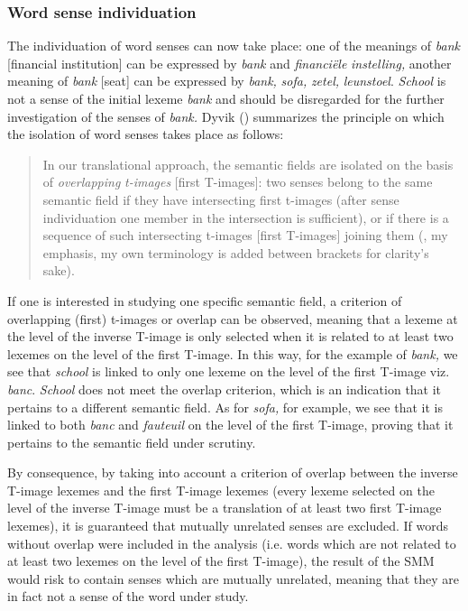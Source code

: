\subsubsection{Word sense individuation}
\label{sec:3.4.3.4}
The individuation of word senses can now take place: one of the meanings of \textit{bank} [financial institution] can be expressed by \textit{bank} and \textit{financiële} \textit{instelling,} another meaning of \textit{bank} [seat] can be expressed by \textit{bank,} \textit{sofa,} \textit{zetel,} \textit{leunstoel}. \textit{School} is not a sense of the initial lexeme \textit{bank} and should be disregarded for the further investigation of the senses of \textit{bank.} Dyvik (\citealt[33]{langemets_translations_2005}) summarizes the principle on which the isolation of word senses takes place as follows:

\begin{quote}
In our translational approach, the semantic fields are isolated on the basis of \textit{overlapping} \textit{t-images}\textbf{ }[first T-images]: two senses belong to the same semantic field if they have intersecting first t-images (after sense individuation one member in the intersection is sufficient), or if there is a sequence of such intersecting t-images [first T-images] joining them (\citealt[33]{langemets_translations_2005}, my emphasis, my own terminology is added between brackets for clarity’s sake).
\end{quote}

If one is interested in studying one specific semantic field, a criterion of overlapping (first) t-images or overlap can be observed, meaning that a lexeme at the level of the inverse T-image is only selected when it is related to at least two lexemes on the level of the first T-image. In this way, for the example of \textit{bank,} we see that \textit{school} is linked to only one lexeme on the level of the first T-image viz. \textit{banc}. \textit{School} does not meet the overlap criterion, which is an indication that it pertains to a different semantic field. As for \textit{sofa,} for example, we see that it is linked to both \textit{banc} and \textit{fauteuil} on the level of the first T-image, proving that it pertains to the semantic field under scrutiny.

By consequence, by taking into account a criterion of overlap between the inverse T-image lexemes and the first T-image lexemes (every lexeme selected on the level of the inverse T-image must be a translation of at least two first T-image lexemes), it is guaranteed that mutually unrelated senses are excluded. If words without overlap were included in the analysis (i.e. words which are not related to at least two lexemes on the level of the first T-image), the result of the SMM would risk to contain senses which are mutually unrelated, meaning that they are in fact not a sense of the word under study.

